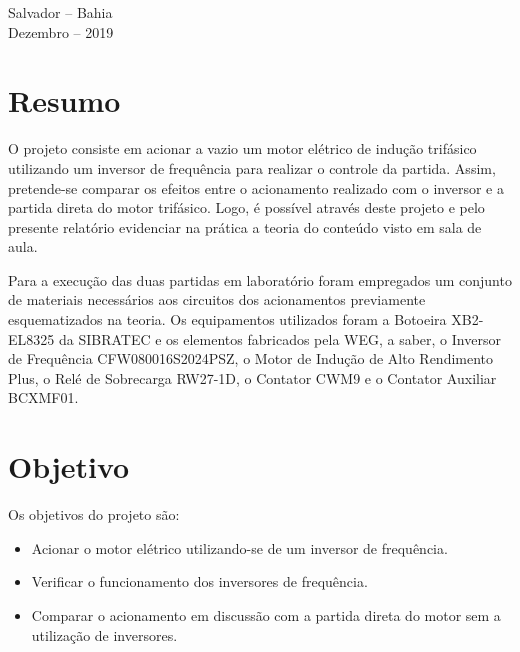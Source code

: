 \documentclass[a4paper, 12pt,oneside, english, brazil]{abntex2}
\begin{document}
\begin{folhaderosto}
\begin{flushright}
\begin{list}{}{
      \setlength{\leftmargin}{6.5cm}
      \setlength{\rightmargin}{0cm}
     \setlength{\labelwidth}{0pt}
     \setlength{\labelsep}{\leftmargin}}
\begin{list}{}{
      \setlength{\leftmargin}{0cm}
      \setlength{\rightmargin}{0cm}
      \setlength{\labelwidth}{0pt}
      \setlength{\labelsep}{\leftmargin}}
      \end{list}
   \end{list}
\end{flushright}
\vspace{1cm}
\begin{center}
		\vspace{\fill}
		 Salvador -- Bahia\\
		 Dezembro -- 2019\\
		 
			\end{center}
\end{folhaderosto}
\newpage
\newpage
\tableofcontents*

\newpage
\listoffigures*

\newpage
{}
\chapter{Resumo}

O projeto consiste em acionar a vazio um motor elétrico de indução trifásico utilizando um inversor de frequência para realizar o controle da partida. Assim, pretende-se comparar os efeitos entre o acionamento realizado com o inversor e a partida direta do motor trifásico. Logo, é possível através deste projeto e pelo presente relatório evidenciar na prática a teoria do conteúdo visto em sala de aula.

Para a execução das duas partidas em laboratório foram empregados um conjunto de materiais necessários aos circuitos dos acionamentos previamente esquematizados na teoria. Os equipamentos utilizados foram a Botoeira XB2-EL8325 da SIBRATEC e os elementos fabricados pela WEG, a saber, o Inversor de Frequência CFW080016S2024PSZ, o Motor de Indução de Alto Rendimento Plus, o Relé de Sobrecarga RW27-1D, o Contator CWM9 e o Contator Auxiliar BCXMF01. 


\chapter{Objetivo}

Os objetivos do projeto são:
\begin{itemize}
    \item Acionar o motor elétrico utilizando-se de um inversor de frequência.
    \item Verificar o funcionamento dos inversores de frequência.
    \item Comparar o acionamento em discussão com a partida direta do motor sem a utilização de inversores.
    
\end{itemize}
\end{document}
